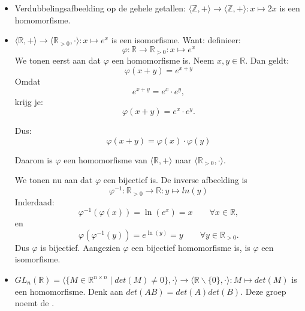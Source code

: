 \textbf{}
\begin{itemize}
    \item Verdubbelingsafbeelding op de gehele getallen: $\langle \mathbb{Z}, + \rangle \to \langle \mathbb{Z},+ \rangle : x \mapsto 2x$ is een homomorfisme.
    \item $\langle \mathbb{R},+ \rangle \to \langle \mathbb{R}_{>0},\cdot \rangle : x \mapsto e^x$ is een isomorfisme. Want: definieer:
    \begin{equation*}
        \varphi : \mathbb{R} \to \mathbb{R}_{>0} : x \mapsto e^x
    \end{equation*}
    We tonen eerst aan dat $\varphi$ een homomorfisme is. Neem $x,y \in \mathbb{R}$. Dan geldt:
    \begin{equation*}
        \varphi(x+y) = e^{x+y}
    \end{equation*}
    Omdat
    \begin{equation*}
        e^{x+y} = e^x \cdot e^y,
    \end{equation*}
    krijg je:
    \begin{equation*}
        \varphi(x+y) = e^x \cdot e^y.
    \end{equation*}

    Dus:
    \begin{equation*}
        \varphi(x+y) = \varphi(x) \cdot \varphi(y)
    \end{equation*}

    Daarom is $\varphi$ een homomorfisme van $\langle \mathbb{R},+ \rangle$ naar $\langle \mathbb{R}_{>0},\cdot \rangle$.

    We tonen nu aan dat $\varphi$ een bijectief is. De inverse afbeelding is
    \begin{equation*}
        \varphi^{-1} : \mathbb{R}_{>0} \to \mathbb{R} : y \mapsto ln(y)
    \end{equation*}
    Inderdaad:
    \begin{equation*}
        \varphi^{-1}(\varphi(x)) = \ln(e^x) = x \qquad \forall x \in \mathbb{R},
    \end{equation*}
    en
    \begin{equation*}
        \varphi(\varphi^{-1}(y)) = e^{\ln(y)} = y \qquad \forall y \in \mathbb{R}_{>0}.
    \end{equation*}
    Dus $\varphi$ is bijectief. Aangezien $\varphi$ een bijectief homomorfisme is, is $\varphi$ een isomorfisme.

    \item $GL_n(\mathbb{R}) = \langle\{M \in \mathbb{R}^{n \times n} \mid det(M) \neq 0\}, \cdot \rangle \to \langle \mathbb{R}\backslash\{0\},\cdot \rangle : M \mapsto det(M)$ is een homomorfisme. Denk aan $det(AB) = det(A)det(B)$. Deze groep noemt de .
    

\end{itemize}
